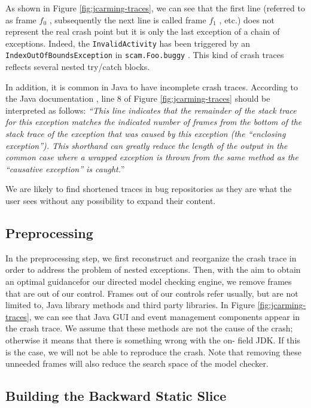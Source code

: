 As shown in Figure \ref{fig:jcarming-traces}, we can see that the first line (referred to
as frame {\it $f_0$} , subsequently the next line is called frame {\it $f_1$} , etc.)
does not represent the real crash point but it is only the last
exception of a chain of exceptions. Indeed, the {\tt InvalidActivity}
has been triggered by an {\tt IndexOutOfBoundsException} in
{\tt scam.Foo.buggy} . This kind of crash traces reflects several
nested try/catch blocks.

In addition, it is common in Java to have incomplete crash
traces. According to the Java documentation \cite{Oracle2011}, line 8 of
Figure \ref{fig:jcarming-traces} should be interpreted as follows: {\it ``This line indicates
that the remainder of the stack trace for this exception
matches the indicated number of frames from the bottom of the
stack trace of the exception that was caused by this exception
(the ``enclosing exception''). This shorthand can greatly
reduce the length of the output in the common case where a
wrapped exception is thrown from the same method as the
``causative exception'' is caught.}''

We are likely to find shortened traces in bug repositories as
they are what the user sees without any possibility to expand
their content.

\subsection{Preprocessing}

In the preprocessing step, we first reconstruct and reorganize
the crash trace in order to address the problem of nested
exceptions. Then, with the aim to obtain an optimal guidancefor our directed model checking engine, we remove frames
that are out of our control. Frames out of our controls refer
usually, but are not limited to, Java library methods and third
party libraries. In Figure \ref{fig:jcarming-traces}, we can see that Java GUI and
event management components appear in the crash trace. We
assume that these methods are not the cause of the crash;
otherwise it means that there is something wrong with the on-
field JDK. If this is the case, we will not be able to reproduce
the crash. Note that removing these unneeded frames will also
reduce the search space of the model checker.

\subsection{Building the Backward Static Slice}

